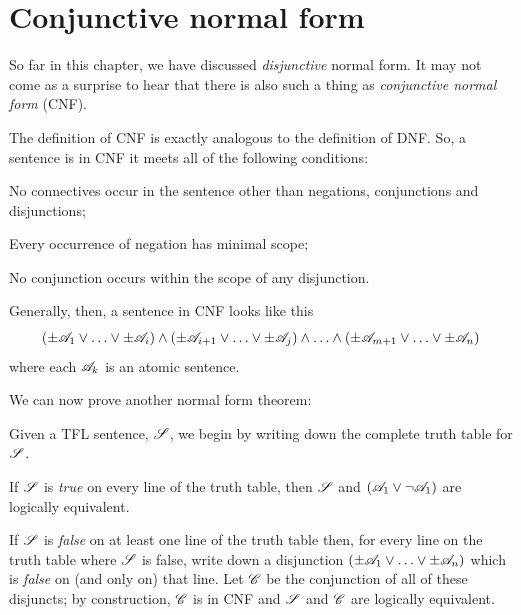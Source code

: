 \section{Conjunctive normal form}
\label{s:CNF}

So far in this chapter, we have discussed \emph{disjunctive} normal form. It may not come as a surprise to hear that there is also such a thing as \emph{conjunctive normal form} (CNF).

The definition of CNF is exactly analogous to the definition of DNF. So, a sentence is in CNF \emph{\ifeff} it meets all of the following conditions:
	\begin{compactlist}
		\item[(\textsc{cnf1})] No connectives occur in the sentence other than negations, conjunctions and disjunctions;
		\item[(\textsc{cnf2})] Every occurrence of negation has minimal scope;
		\item[(\textsc{cnf3})] No conjunction occurs within the scope of any disjunction.
	\end{compactlist}
Generally, then, a sentence in CNF looks like this
	$$(\pm \mathscr{A}_1 \lor \ldots \lor \pm \mathscr{A}_i) \land (\pm \mathscr{A}_{i+1} \lor \ldots \lor \pm\mathscr{A}_j) \land \ldots \land (\pm\mathscr{A}_{m+1} \lor\ldots \lor \pm \mathscr{A}_n)$$
where each $\mathscr{A}_k$ is an atomic sentence.

We can now prove another normal form theorem:

        
	Given a TFL sentence, $\mathscr{S}$, we begin by writing down the complete truth table for $\mathscr{S}$.
	
	If $\mathscr{S}$ is \emph{true} on every line of the truth table, then $\mathscr{S}$ and $(\mathscr{A}_1 \vee \neg \mathscr{A}_1)$ are logically equivalent.
	
	If $\mathscr{S}$ is \emph{false} on at least one line of the truth table then, for every line on the truth table where $\mathscr{S}$ is false, write down a disjunction $(\pm\mathscr{A}_1 \vee \ldots \vee \pm\mathscr{A}_n)$ which is \emph{false} on (and only on) that line. Let $\mathscr{C}$ be the conjunction of all of these disjuncts; by construction, $\mathscr{C}$ is in CNF and $\mathscr{S}$ and $\mathscr{C}$ are logically equivalent.

